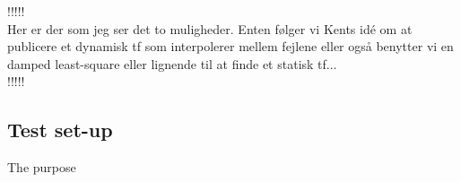 !!!!!\\
Her er der som jeg ser det to muligheder. Enten følger vi Kents idé om at publicere et dynamisk tf som interpolerer mellem fejlene eller også benytter vi en damped least-square eller lignende til at finde et statisk tf...\\
!!!!!\\


\subsection{Test set-up}
The purpose 



